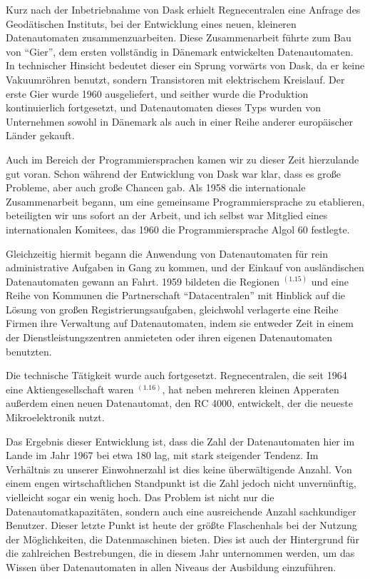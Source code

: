 {Kurz nach der Inbetriebnahme von Dask erhielt Regnecentralen eine Anfrage des Geodätischen Instituts, bei der Entwicklung eines neuen, kleineren Datenautomaten zusammenzuarbeiten. Diese Zusammenarbeit führte zum Bau von \enquote{Gier}, dem ersten vollständig in Dänemark entwickelten Datenautomaten. In technischer Hinsicht bedeutet dieser ein Sprung vorwärts von Dask, da er keine Vakuumröhren benutzt, sondern Transistoren mit elektrischem Kreislauf. Der erste Gier wurde 1960 ausgeliefert, und seither wurde die Produktion kontinuierlich fortgesetzt, und Datenautomaten dieses Typs wurden von Unternehmen sowohl in Dänemark als auch in einer Reihe anderer europäischer Länder gekauft. 

Auch im Bereich der Programmiersprachen kamen wir zu dieser Zeit hierzulande gut voran. Schon während der Entwicklung von Dask war klar, dass es große Probleme, aber auch große Chancen gab. Als 1958 die internationale Zusammenarbeit begann, um eine gemeinsame Programmiersprache zu etablieren, beteiligten wir uns sofort an der Arbeit, und ich selbst war Mitglied eines internationalen Komitees, das 1960 die Programmiersprache Algol 60 festlegte.

Gleichzeitig hiermit begann die Anwendung von Datenautomaten für rein administrative Aufgaben in Gang zu kommen, und der Einkauf von ausländischen Datenautomaten gewann an Fahrt. 1959 bildeten die Regionen $^{(1.15)}$ und eine Reihe von Kommunen die Partnerschaft \enquote{Datacentralen} mit Hinblick auf die Lösung von großen Registrierungsaufgaben, gleichwohl verlagerte eine Reihe Firmen ihre Verwaltung auf Datenautomaten, indem sie entweder Zeit in einem der Dienstleistungszentren anmieteten oder ihren eigenen Datenautomaten benutzten. 

Die technische Tätigkeit wurde auch fortgesetzt. Regnecentralen, die seit 1964 eine Aktiengesellschaft waren $^{(1.16)}$, hat neben mehreren kleinen Apperaten außerdem einen neuen Datenautomat, den RC 4000, entwickelt, der die neueste Mikroelektronik nutzt.

Das Ergebnis dieser Entwicklung ist, dass die Zahl der Datenautomaten hier im Lande im Jahr 1967 bei etwa 180 lag, mit stark steigender Tendenz. Im Verhältnis zu unserer Einwohnerzahl ist dies keine überwältigende Anzahl. Von einem engen wirtschaftlichen Standpunkt ist die Zahl jedoch nicht unvernünftig, vielleicht sogar ein wenig hoch. Das Problem ist nicht nur die Datenautomatkapazitäten, sondern auch eine ausreichende Anzahl sachkundiger Benutzer. Dieser letzte Punkt ist heute der größte Flaschenhals bei der Nutzung der Möglichkeiten, die Datenmaschinen bieten. Dies ist auch der Hintergrund für die zahlreichen Bestrebungen, die in diesem Jahr unternommen werden, um das Wissen über Datenautomaten in allen Niveaus der Ausbildung einzuführen. 

}
